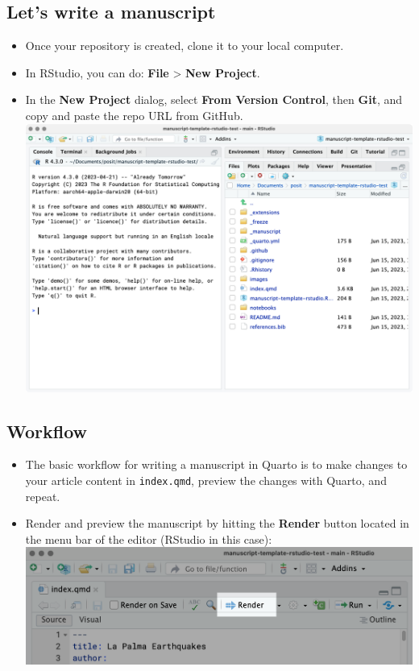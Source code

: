 \documentclass[
  letterpaper,
  DIV=11,
  numbers=noendperiod]{scrartcl}
\providecommand{\tightlist}{%
  \setlength{\itemsep}{0pt}\setlength{\parskip}{0pt}}\usepackage{longtable,booktabs,array}
\begin{document}
\subsection{Let's write a manuscript}\label{lets-write-a-manuscript-3}

\begin{itemize}
\tightlist
\item
  Once your repository is created, clone it to your local computer.
\item
  In RStudio, you can do: \textbf{File} \textgreater{} \textbf{New
  Project}.
\item
  In the \textbf{New Project} dialog, select \textbf{From Version
  Control}, then \textbf{Git}, and copy and paste the repo URL from
  GitHub. \includegraphics{img/rstudio_git_manuscript.png}
\end{itemize}

\subsection{Workflow}\label{workflow}

\begin{itemize}
\item
  The basic workflow for writing a manuscript in Quarto is to make
  changes to your article content in \texttt{index.qmd}, preview the
  changes with Quarto, and repeat.
\item
  Render and preview the manuscript by hitting the \textbf{Render}
  button located in the menu bar of the editor (RStudio in this case):
  \includegraphics{img/renderbutton.png}
\end{itemize}
\end{document}
